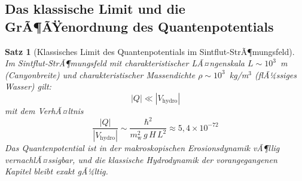 ﻿\documentclass[12pt,a4paper]{report}
\newtheorem{theorem}{Satz}[chapter]
\begin{document}
\subsection{Das klassische Limit und die GrÃ¶ÃŸenordnung des Quantenpotentials}

\begin{theorem}[Klassisches Limit des Quantenpotentials im Sintflut-StrÃ¶mungsfeld]
	\label{thm:klasslimit}
	Im Sintflut-StrÃ¶mungsfeld mit charakteristischer LÃ¤ngenskala $L \sim 10^3$~m (Canyonbreite) und charakteristischer Massendichte $\rho \sim 10^3$~kg/m$^3$ (flÃ¼ssiges Wasser) gilt:
	\begin{equation}
		|Q| \ll |V_\mathrm{hydro}|
		\label{eq:klasslimit}
	\end{equation}
	mit dem VerhÃ¤ltnis
	\begin{equation}
		\frac{|Q|}{|V_\mathrm{hydro}|} \sim \frac{\hbar^2}{m_\mathrm{w}^2\,g\,H\,L^2} \approx 5{,}4\times10^{-72}
		\label{eq:verhaeltnis_quanten_klassisch}
	\end{equation}
	Das Quantenpotential ist in der makroskopischen Erosionsdynamik vÃ¶llig vernachlÃ¤ssigbar, und die klassische Hydrodynamik der vorangegangenen Kapitel bleibt exakt gÃ¼ltig.
\end{theorem}
\end{document}
